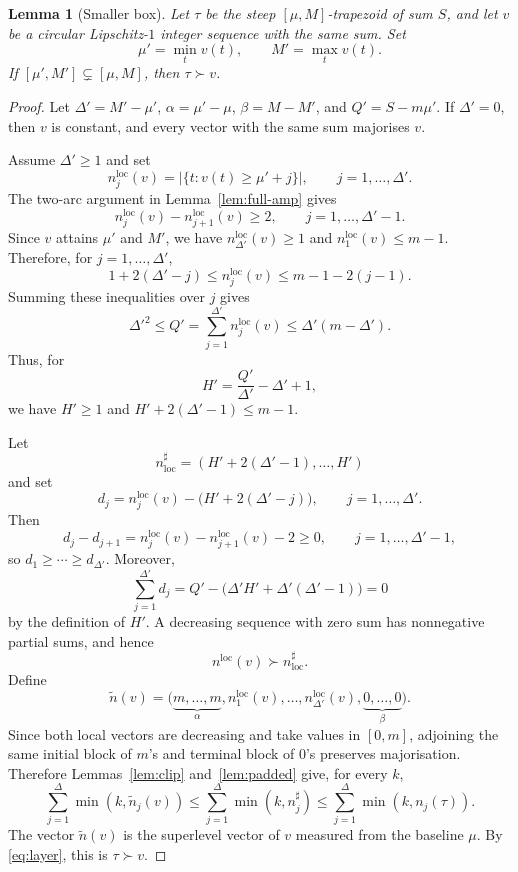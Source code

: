 \documentclass[10pt,a4paper]{amsart}
\theoremstyle{plain}
\newtheorem{lemma}[theorem]{Lemma}
\theoremstyle{definition}
\begin{document}
\begin{lemma}[Smaller box]\label{lem:smaller-box}
Let $\tau$ be the steep $[\mu,M]$-trapezoid of sum $S$, and let $v$ be a circular Lipschitz-$1$ integer sequence with the same sum. Set
\[
\mu'=\min_tv(t),
\qquad
M'=\max_tv(t).
\]
If $[\mu',M']\subsetneq[\mu,M]$, then $\tau\succ v$.
\end{lemma}

\begin{proof}
Let $\Delta'=M'-\mu'$, $\alpha=\mu'-\mu$, $\beta=M-M'$, and $Q'=S-m\mu'$. If $\Delta'=0$, then $v$ is constant, and every vector with the same sum majorises $v$.

Assume $\Delta'\ge1$ and set
\[
n_j^{\mathrm{loc}}(v)=|\{t:v(t)\ge\mu'+j\}|,
\qquad j=1,\dots,\Delta'.
\]
The two-arc argument in Lemma~\ref{lem:full-amp} gives
\[
n_j^{\mathrm{loc}}(v)-n_{j+1}^{\mathrm{loc}}(v)\ge2,
\qquad j=1,\dots,\Delta'-1.
\]
Since $v$ attains $\mu'$ and $M'$, we have $n_{\Delta'}^{\mathrm{loc}}(v)\ge1$ and $n_1^{\mathrm{loc}}(v)\le m-1$. Therefore, for $j=1,\dots,\Delta'$,
\[
1+2(\Delta'-j)
\le n_j^{\mathrm{loc}}(v)
\le m-1-2(j-1).
\]
Summing these inequalities over $j$ gives
\[
\Delta'^2\le Q'=\sum_{j=1}^{\Delta'}n_j^{\mathrm{loc}}(v)
\le\Delta'(m-\Delta').
\]
Thus, for
\[
H'=\frac{Q'}{\Delta'}-\Delta'+1,
\]
we have $H'\ge1$ and $H'+2(\Delta'-1)\le m-1$.

Let
\[
n^\sharp_{\mathrm{loc}}=(H'+2(\Delta'-1),\dots,H')
\]
and set
\[
d_j=n_j^{\mathrm{loc}}(v)-\bigl(H'+2(\Delta'-j)\bigr),
\qquad j=1,\dots,\Delta'.
\]
Then
\[
d_j-d_{j+1}
=n_j^{\mathrm{loc}}(v)-n_{j+1}^{\mathrm{loc}}(v)-2
\ge0,
\qquad j=1,\dots,\Delta'-1,
\]
so $d_1\ge\cdots\ge d_{\Delta'}$. Moreover,
\[
\sum_{j=1}^{\Delta'}d_j
=Q'-\bigl(\Delta'H'+\Delta'(\Delta'-1)\bigr)
=0
\]
by the definition of $H'$. A decreasing sequence with zero sum has nonnegative partial sums, and hence
\[
n^{\mathrm{loc}}(v)\succ n^\sharp_{\mathrm{loc}}.
\]
Define
\[
\widetilde n(v)
=\bigl(
\underbrace{m,\dots,m}_{\alpha},
 n_1^{\mathrm{loc}}(v),\dots,n_{\Delta'}^{\mathrm{loc}}(v),
\underbrace{0,\dots,0}_{\beta}
\bigr).
\]
Since both local vectors are decreasing and take values in $[0,m]$, adjoining the same initial block of $m$'s and terminal block of $0$'s preserves majorisation. Therefore Lemmas~\ref{lem:clip} and~\ref{lem:padded} give, for every $k$,
\[
\sum_{j=1}^\Delta\min(k,\widetilde n_j(v))
\le
\sum_{j=1}^\Delta\min(k,n_j^\sharp)
\le
\sum_{j=1}^\Delta\min(k,n_j(\tau)).
\]
The vector $\widetilde n(v)$ is the superlevel vector of $v$ measured from the baseline $\mu$. By \eqref{eq:layer}, this is $\tau\succ v$.
\end{proof}
\end{document}
